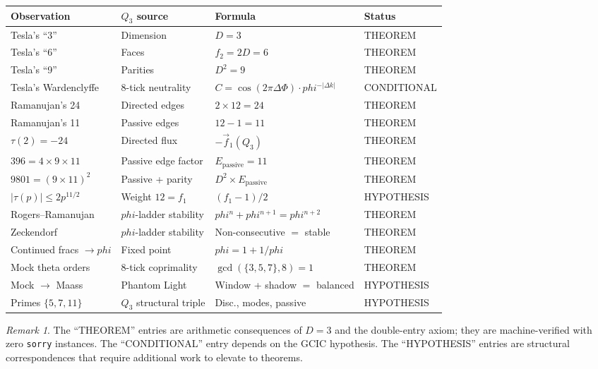 \documentclass[11pt]{article}
\def\phig{phi}
\theoremstyle{plain}
\theoremstyle{definition}
\theoremstyle{remark}
\newtheorem{remark}[theorem]{Remark}
\newcommand{\phig}{\varphi}
\begin{document}
\begin{center}
\renewcommand{\arraystretch}{1.2}
\begin{tabular}{p{2.8cm}p{3.2cm}p{4cm}p{2cm}}
\toprule
\textbf{Observation} & \textbf{$Q_3$ source} & \textbf{Formula} & \textbf{Status} \\
\midrule
Tesla's ``3'' & Dimension & $D = 3$ & THEOREM \\
Tesla's ``6'' & Faces & $f_2 = 2D = 6$ & THEOREM \\
Tesla's ``9'' & Parities & $D^2 = 9$ & THEOREM \\
Tesla's Wardenclyffe & 8-tick neutrality & $C = \cos(2\pi\Delta\Phi)\cdot\phig^{-|\Delta k|}$ & CONDITIONAL \\
\midrule
Ramanujan's 24 & Directed edges & $2 \times 12 = 24$ & THEOREM \\
Ramanujan's 11 & Passive edges & $12 - 1 = 11$ & THEOREM \\
$\tau(2) = -24$ & Directed flux & $-\vec{f}_1(Q_3)$ & THEOREM \\
$396 = 4 \times 9 \times 11$ & Passive edge factor & $E_{\mathrm{passive}} = 11$ & THEOREM \\
$9801 = (9 \times 11)^2$ & Passive + parity & $D^2 \times E_{\mathrm{passive}}$ & THEOREM \\
$|\tau(p)| \le 2p^{11/2}$ & Weight $12 = f_1$ & $(f_1 - 1)/2$ & HYPOTHESIS \\
Rogers--Ramanujan & $\phig$-ladder stability & $\phig^n + \phig^{n+1} = \phig^{n+2}$ & THEOREM \\
Zeckendorf & $\phig$-ladder stability & Non-consecutive $=$ stable & THEOREM \\
Continued fracs $\to \phig$ & Fixed point & $\phig = 1 + 1/\phig$ & THEOREM \\
Mock theta orders & 8-tick coprimality & $\gcd(\{3,5,7\}, 8) = 1$ & THEOREM \\
Mock $\to$ Maass & Phantom Light & Window + shadow $=$ balanced & HYPOTHESIS \\
Primes $\{5,7,11\}$ & $Q_3$ structural triple & Disc., modes, passive & HYPOTHESIS \\
\bottomrule
\end{tabular}
\end{center}

\begin{remark}
The ``THEOREM'' entries are arithmetic consequences of $D = 3$ and the double-entry axiom; they are machine-verified with zero \texttt{sorry} instances.
The ``CONDITIONAL'' entry depends on the GCIC hypothesis.
The ``HYPOTHESIS'' entries are structural correspondences that require additional work to elevate to theorems.
\end{remark}
\end{document}
